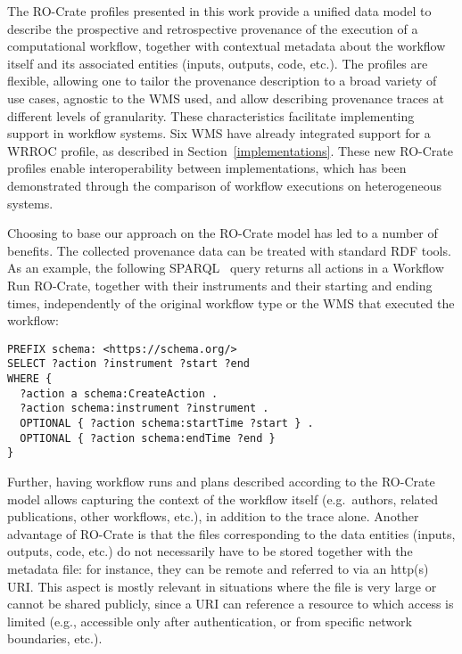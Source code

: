 \documentclass[10pt,letterpaper]{article}
\begin{document}
The RO-Crate profiles presented in this work provide a unified data model to describe the prospective and retrospective provenance of the execution of a computational workflow, together with contextual metadata about the workflow itself and its associated entities (inputs, outputs, code, etc.).
The profiles are flexible, allowing one to tailor the provenance description to a broad variety of use cases, agnostic to the WMS used, and allow describing provenance traces at different levels of granularity.
These characteristics facilitate implementing support in workflow systems. Six WMS have already integrated support for a WRROC profile, as described in Section~\ref{implementations}. These new RO-Crate profiles enable interoperability between implementations, which has been demonstrated through the comparison of workflow executions on heterogeneous systems.

Choosing to base our approach on the RO-Crate model has led to a number of
benefits. The collected provenance data can be treated with standard RDF tools. As an example, the following SPARQL~\cite{sparql11-overview} query returns all actions in a Workflow Run RO-Crate, together with their instruments and their starting and ending times, independently of the original workflow type or the WMS that executed the workflow:
%
\begin{verbatim}
PREFIX schema: <https://schema.org/>
SELECT ?action ?instrument ?start ?end
WHERE {
  ?action a schema:CreateAction .
  ?action schema:instrument ?instrument .
  OPTIONAL { ?action schema:startTime ?start } .
  OPTIONAL { ?action schema:endTime ?end }
}
\end{verbatim}
%
Further, having workflow runs and plans described according to the RO-Crate model allows capturing the context of the workflow itself (e.g.~authors, related publications, other workflows, etc.), in addition to the trace alone.
%
Another advantage of RO-Crate is that the files corresponding to the data entities (inputs, outputs, code, etc.) do not necessarily have to be stored together with the metadata file: for instance, they can be remote and referred to via an http(s) URI. This aspect is mostly relevant in situations where the file is very large or cannot be shared publicly, since a URI can reference a resource to which access is limited (e.g., accessible only after authentication, or from specific network boundaries, etc.).
\end{document}

